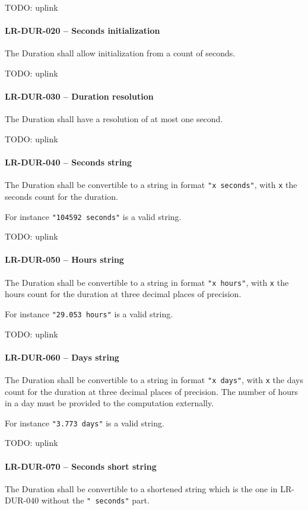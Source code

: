 TODO: uplink
\paragraph{LR-DUR-020 -- Seconds initialization}
The Duration shall allow initialization from a count of seconds.

TODO: uplink
\paragraph{LR-DUR-030 -- Duration resolution}
The Duration shall have a resolution of at most one second.

TODO: uplink
\paragraph{LR-DUR-040 -- Seconds string}
The Duration shall be convertible to a string in format
\lstinline{"x seconds"}, with \lstinline{x} the seconds count
for the duration.

For instance \lstinline{"104592 seconds"} is a valid string.

TODO: uplink
\paragraph{LR-DUR-050 -- Hours string}
The Duration shall be convertible to a string in format
\lstinline{"x hours"}, with \lstinline{x} the hours count
for the duration at three decimal places of precision.

For instance \lstinline{"29.053 hours"} is a valid string.

TODO: uplink
\paragraph{LR-DUR-060 -- Days string}
The Duration shall be convertible to a string in format
\lstinline{"x days"}, with \lstinline{x} the days count
for the duration at three decimal places of precision.
The number of hours in a day must be provided to the
computation externally.

For instance \lstinline{"3.773 days"} is a valid string.

TODO: uplink
\paragraph{LR-DUR-070 -- Seconds short string}
The Duration shall be convertible to a shortened string which
is the one in LR-DUR-040 without the \lstinline{" seconds"}
part.

